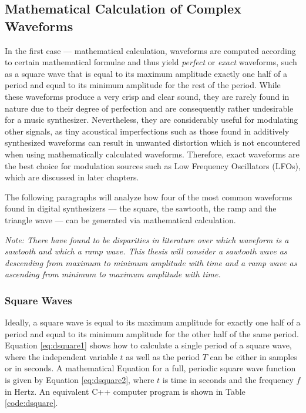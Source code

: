 \subsection{Mathematical Calculation of Complex Waveforms}

In the first case --- mathematical calculation, waveforms are computed according to certain mathematical formulae and thus yield \emph{perfect} or \emph{exact} waveforms, such as a square wave that is equal to its maximum amplitude exactly one half of a period and equal to its minimum amplitude for the rest of the period. While these waveforms produce a very crisp and clear sound, they are rarely found in nature due to their degree of perfection and are consequently rather undesirable for a music synthesizer. Nevertheless, they are considerably useful for modulating other signals, as tiny acoustical imperfections such as those found in additively synthesized waveforms can result in unwanted distortion which is not encountered when using mathematically calculated waveforms. Therefore, exact waveforms are the best choice for modulation sources such as Low Frequency Oscillators (LFOs), which are discussed in later chapters. 


The following paragraphs will analyze how four of the most common waveforms found in digital synthesizers --- the square, the sawtooth, the ramp and the triangle wave --- can be generated via mathematical calculation.


\emph{Note: There have found to be disparities in literature over which waveform is a sawtooth and which a ramp wave. This thesis will consider a sawtooth wave as descending from maximum to minimum amplitude with time and a ramp wave as ascending from minimum to maximum amplitude with time.}

\subsubsection{Square Waves}

Ideally, a square wave is equal to its maximum amplitude for exactly one half of a period and equal to its minimum amplitude for the other half of the same period. Equation \ref{eq:dsquare1} shows how to calculate a single period of a square wave, where the independent variable $t$ as well as the period $T$ can be either in samples or in seconds. A mathematical Equation for a full, periodic square wave function is given by Equation \ref{eq:dsquare2}, where $t$ is time in seconds and the frequency $f$ in Hertz. An equivalent C++ computer program is shown in Table \ref{code:dsquare}.


